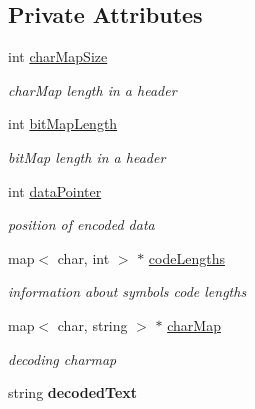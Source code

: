 \subsection*{Private Attributes}
\begin{DoxyCompactItemize}
\item 
int \hyperlink{classDecoder_a21ea25313ec87b94185eafb51da7e15d}{char\+Map\+Size}\hypertarget{classDecoder_a21ea25313ec87b94185eafb51da7e15d}{}\label{classDecoder_a21ea25313ec87b94185eafb51da7e15d}

\begin{DoxyCompactList}\small\item\em char\+Map length in a header \end{DoxyCompactList}\item 
int \hyperlink{classDecoder_a0eaa7c0c02c4c55d4e1080f3fb35fb07}{bit\+Map\+Length}\hypertarget{classDecoder_a0eaa7c0c02c4c55d4e1080f3fb35fb07}{}\label{classDecoder_a0eaa7c0c02c4c55d4e1080f3fb35fb07}

\begin{DoxyCompactList}\small\item\em bit\+Map length in a header \end{DoxyCompactList}\item 
int \hyperlink{classDecoder_a42530dfe1c682188ee3abf2594bc636e}{data\+Pointer}\hypertarget{classDecoder_a42530dfe1c682188ee3abf2594bc636e}{}\label{classDecoder_a42530dfe1c682188ee3abf2594bc636e}

\begin{DoxyCompactList}\small\item\em position of encoded data \end{DoxyCompactList}\item 
map$<$ char, int $>$ $\ast$ \hyperlink{classDecoder_a6369e8fbf85e15c78f4a559289ba8d32}{code\+Lengths}\hypertarget{classDecoder_a6369e8fbf85e15c78f4a559289ba8d32}{}\label{classDecoder_a6369e8fbf85e15c78f4a559289ba8d32}

\begin{DoxyCompactList}\small\item\em information about symbols code lengths \end{DoxyCompactList}\item 
map$<$ char, string $>$ $\ast$ \hyperlink{classDecoder_afb5141532719024337576680947c050b}{char\+Map}\hypertarget{classDecoder_afb5141532719024337576680947c050b}{}\label{classDecoder_afb5141532719024337576680947c050b}

\begin{DoxyCompactList}\small\item\em decoding charmap \end{DoxyCompactList}\item 
string {\bfseries decoded\+Text}\hypertarget{classDecoder_a9138a6ec9e73a3485e6dd4f99602e8b3}{}\label{classDecoder_a9138a6ec9e73a3485e6dd4f99602e8b3}

\end{DoxyCompactItemize}


